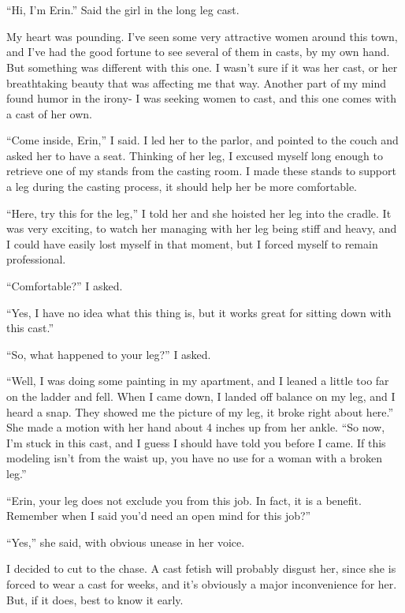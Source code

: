 \chapter{~}
``Hi, I'm Erin.'' Said the girl in the long leg cast.

My heart was pounding. I've seen some very attractive women around this town, and I've had
the good fortune to see several of them in casts, by my own hand. But something was different
with this one. I wasn't sure if it was her cast, or her breathtaking beauty that was affecting
me that way. Another part of my mind found humor in the irony- I was seeking women to cast, and
this one comes with a cast of her own.

``Come inside, Erin,'' I said. I led her to the parlor, and pointed to the couch and asked
her to have a seat. Thinking of her leg, I excused myself long enough to retrieve one of my
stands from the casting room. I made these stands to support a leg during the casting process,
it should help her be more comfortable.

``Here, try this for the leg,'' I told her and she hoisted her leg into the cradle. It was
very exciting, to watch her managing with her leg being stiff and heavy, and I could have easily
lost myself in that moment, but I forced myself to remain professional.

``Comfortable?'' I asked.

``Yes, I have no idea what this thing is, but it works great for sitting down with this
cast.''


``So, what happened to your leg?'' I asked.

``Well, I was doing some painting in my apartment, and I leaned a little too far on the
ladder and fell. When I came down, I landed off balance on my leg, and I heard a snap. They
showed me the picture of my leg, it broke right about here.'' She made a motion with her hand
about 4 inches up from her ankle. ``So now, I'm stuck in this cast, and I guess I should have
told you before I came. If this modeling isn't from the waist up, you have no use for a woman
with a broken leg.''

``Erin, your leg does not exclude you from this job. In fact, it is a benefit. Remember when
I said you'd need an open mind for this job?''

``Yes,'' she said, with obvious unease in her voice.

I decided to cut to the chase. A cast fetish will probably disgust her, since she is forced
to wear a cast for weeks, and it's obviously a major inconvenience for her. But, if it does,
best to know it early.

